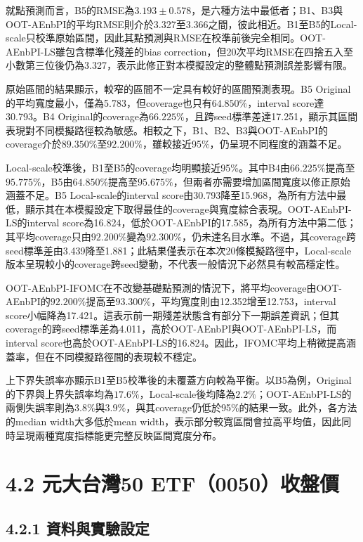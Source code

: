 就點預測而言，B5的RMSE為$3.193\pm0.578$，是六種方法中最低者；B1、B3與OOT-AEnbPI的平均RMSE則介於3.327至3.366之間，彼此相近。B1至B5的Local-scale只校準原始區間，因此其點預測與RMSE在校準前後完全相同。OOT-AEnbPI-LS雖包含標準化殘差的bias correction，但20次平均RMSE在四捨五入至小數第三位後仍為3.327，表示此修正對本模擬設定的整體點預測誤差影響有限。

原始區間的結果顯示，較窄的區間不一定具有較好的區間預測表現。B5 Original的平均寬度最小，僅為5.783，但coverage也只有$64.850\%$，interval score達30.793。B4 Original的coverage為$66.225\%$，且跨seed標準差達17.251，顯示其區間表現對不同模擬路徑較為敏感。相較之下，B1、B2、B3與OOT-AEnbPI的coverage介於$89.350\%$至$92.200\%$，雖較接近95\%，仍呈現不同程度的涵蓋不足。

Local-scale校準後，B1至B5的coverage均明顯接近95\%。其中B4由$66.225\%$提高至$95.775\%$，B5由$64.850\%$提高至$95.675\%$，但兩者亦需要增加區間寬度以修正原始涵蓋不足。B5 Local-scale的interval score由30.793降至15.968，為所有方法中最低，顯示其在本模擬設定下取得最佳的coverage與寬度綜合表現。OOT-AEnbPI-LS的interval score為16.824，低於OOT-AEnbPI的17.585，為所有方法中第二低；其平均coverage只由$92.200\%$變為$92.300\%$，仍未達名目水準。不過，其coverage跨seed標準差由3.439降至1.881；此結果僅表示在本次20條模擬路徑中，Local-scale版本呈現較小的coverage跨seed變動，不代表一般情況下必然具有較高穩定性。

OOT-AEnbPI-IFOMC在不改變基礎點預測的情況下，將平均coverage由OOT-AEnbPI的$92.200\%$提高至$93.300\%$，平均寬度則由12.352增至12.753，interval score小幅降為17.421。這表示前一期殘差狀態含有部分下一期誤差資訊；但其coverage的跨seed標準差為4.011，高於OOT-AEnbPI與OOT-AEnbPI-LS，而interval score也高於OOT-AEnbPI-LS的16.824。因此，IFOMC平均上稍微提高涵蓋率，但在不同模擬路徑間的表現較不穩定。

上下界失誤率亦顯示B1至B5校準後的未覆蓋方向較為平衡。以B5為例，Original的下界與上界失誤率均為$17.6\%$，Local-scale後均降為$2.2\%$；OOT-AEnbPI-LS的兩側失誤率則為$3.8\%$與$3.9\%$，與其coverage仍低於95\%的結果一致。此外，各方法的median width大多低於mean width，表示部分較寬區間會拉高平均值，因此同時呈現兩種寬度指標能更完整反映區間寬度分布。

\section*{4.2 元大台灣50 ETF（0050）收盤價}

\subsection*{4.2.1 資料與實驗設定}

